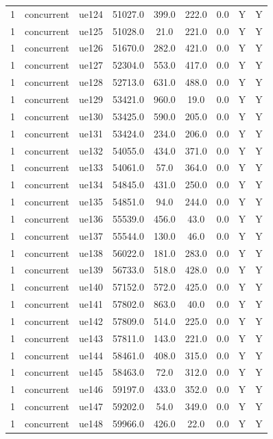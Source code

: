 \begin{table}[ht]
\begin{tabular}{|c|c|c|c|c|c|c|c|c|}
1 & concurrent & ue124 & 51027.0 & 399.0 & 222.0 & 0.0 & Y & Y \\
1 & concurrent & ue125 & 51028.0 & 21.0 & 221.0 & 0.0 & Y & Y \\
1 & concurrent & ue126 & 51670.0 & 282.0 & 421.0 & 0.0 & Y & Y \\
1 & concurrent & ue127 & 52304.0 & 553.0 & 417.0 & 0.0 & Y & Y \\
1 & concurrent & ue128 & 52713.0 & 631.0 & 488.0 & 0.0 & Y & Y \\
1 & concurrent & ue129 & 53421.0 & 960.0 & 19.0 & 0.0 & Y & Y \\
1 & concurrent & ue130 & 53425.0 & 590.0 & 205.0 & 0.0 & Y & Y \\
1 & concurrent & ue131 & 53424.0 & 234.0 & 206.0 & 0.0 & Y & Y \\
1 & concurrent & ue132 & 54055.0 & 434.0 & 371.0 & 0.0 & Y & Y \\
1 & concurrent & ue133 & 54061.0 & 57.0 & 364.0 & 0.0 & Y & Y \\
1 & concurrent & ue134 & 54845.0 & 431.0 & 250.0 & 0.0 & Y & Y \\
1 & concurrent & ue135 & 54851.0 & 94.0 & 244.0 & 0.0 & Y & Y \\
1 & concurrent & ue136 & 55539.0 & 456.0 & 43.0 & 0.0 & Y & Y \\
1 & concurrent & ue137 & 55544.0 & 130.0 & 46.0 & 0.0 & Y & Y \\
1 & concurrent & ue138 & 56022.0 & 181.0 & 283.0 & 0.0 & Y & Y \\
1 & concurrent & ue139 & 56733.0 & 518.0 & 428.0 & 0.0 & Y & Y \\
1 & concurrent & ue140 & 57152.0 & 572.0 & 425.0 & 0.0 & Y & Y \\
1 & concurrent & ue141 & 57802.0 & 863.0 & 40.0 & 0.0 & Y & Y \\
1 & concurrent & ue142 & 57809.0 & 514.0 & 225.0 & 0.0 & Y & Y \\
1 & concurrent & ue143 & 57811.0 & 143.0 & 221.0 & 0.0 & Y & Y \\
1 & concurrent & ue144 & 58461.0 & 408.0 & 315.0 & 0.0 & Y & Y \\
1 & concurrent & ue145 & 58463.0 & 72.0 & 312.0 & 0.0 & Y & Y \\
1 & concurrent & ue146 & 59197.0 & 433.0 & 352.0 & 0.0 & Y & Y \\
1 & concurrent & ue147 & 59202.0 & 54.0 & 349.0 & 0.0 & Y & Y \\
1 & concurrent & ue148 & 59966.0 & 426.0 & 22.0 & 0.0 & Y & Y \\

\end{tabular}
\end{table}
